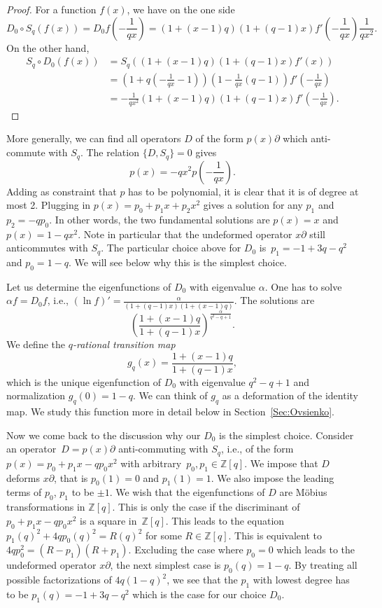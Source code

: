 \documentclass[10pt,a4paper]{amsart}
\numberwithin{equation}{section}
\newcommand*{\Z}{\mathbb{Z}}
\begin{document}
\begin{proof} For a function $f(x)$, we have on the one side
\[
D_0\circ S_q(f(x))=D_0 f\left(-\frac{1}{qx}\right)=(1+(x-1)q)(1+(q-1)x)f'\left(-\frac{1}{qx}\right)\frac{1}{qx^2}.
\]
On the other hand,
\begin{align*}
S_q\circ D_0(f(x)) &= S_q((1+(x-1)q)(1+(q-1)x)f'(x)) \\
&= \left(1+q\left(-\frac{1}{qx}-1\right)\right)\left(1-\frac{1}{qx}(q-1)\right)f'\left(-\frac{1}{qx}\right)\\
&= -\frac{1}{qx^2}(1+(x-1)q)(1+(q-1)x)f'\left(-\frac{1}{qx}\right).\tag*{\qed}
\end{align*}\renewcommand{\qed}{}
\end{proof}

More generally, we can find all operators $D$ of the form $p(x)\partial$ which anti-commute with $S_q$. The relation $\{D,S_q\}=0$ gives
\[
p(x)=-qx^2p\left(-\frac{1}{qx}\right).
\]
Adding as constraint that $p$ has to be polynomial, it is clear that it is of degree at most 2. Plugging in $p(x)=p_0+p_1x+p_2x^2$ gives a solution for any $p_1$ and $p_2=-qp_0$. In other words, the two fundamental solutions are $p(x)=x$ and $p(x)=1-qx^2$.
Note in particular that the undeformed operator $x\partial$ still anticommutes with $S_q$.
The particular choice above for $D_0$ is~${p_1=-1+3q-q^2}$ and $p_0=1-q$. We will see below why this is the simplest choice.

Let us determine the eigenfunctions of $D_0$ with eigenvalue $\alpha$. One has to solve $\alpha f=D_0 f$, i.e., $(\ln f)'=\frac{\alpha}{(1+(q-1)x)(1+(x-1)q)}$. The solutions are
\[
\left(\frac{1+(x-1)q}{1+(q-1)x}\right)^{\frac{\alpha}{q^2-q+1}}.
\]
We define the \emph{$q$-rational transition map}
\begin{equation}\label{Eq-def-g_q}
g_q(x)=\frac{1+(x-1)q}{1+(q-1)x},
\end{equation}
which is the unique eigenfunction of $D_0$ with eigenvalue $q^2-q+1$ and normalization $g_q(0)=1-q$. We can think of $g_q$ as a deformation of the identity map. We study this function more in detail below in Section~\ref{Sec:Ovsienko}.

Now we come back to the discussion why our $D_0$ is the simplest choice. Consider an operator~${D=p(x)\partial}$ anti-commuting with $S_q$, i.e., of the form $p(x)=p_0+p_1x-qp_0x^2$ with arbitrary~${p_0,p_1\in\Z[q]}$. We impose that $D$ deforms $x\partial$, that is $p_0(1)=0$ and $p_1(1)=1$. We also impose the leading terms of $p_0$, $p_1$ to be $\pm 1$. We wish that the eigenfunctions of $D$ are M\"obius transformations in $\Z[q]$. This is only the case if the discriminant of $p_0+p_1x-qp_0x^2$ is a square in~$\Z[q]$. This leads to the equation $p_1(q)^2+4qp_0(q)^2=R(q)^2$ for some $R\in\Z[q]$. This is equivalent to $4qp_0^2=(R-p_1)(R+p_1)$. Excluding the case where $p_0=0$ which leads to the undeformed operator $x\partial$, the next simplest case is $p_0(q)=1-q$. By treating all possible factorizations of $4q(1-q)^2$, we see that the $p_1$ with lowest degree has to be $p_1(q)=-1+3q-q^2$ which is the case for our choice $D_0$.
\end{document}
